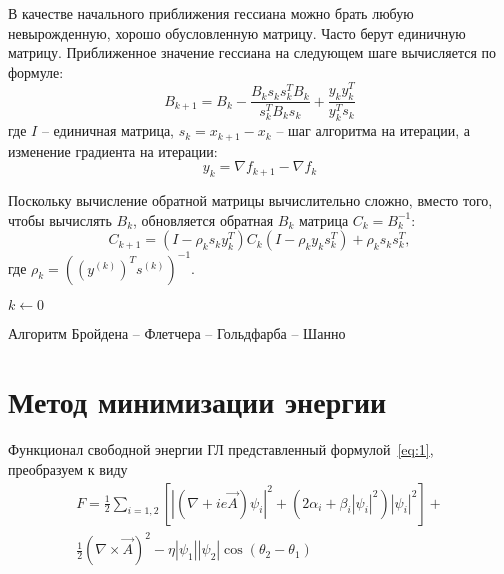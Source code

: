 В качестве начального приближения гессиана можно брать любую невырожденную, 
хорошо обусловленную матрицу. Часто берут единичную матрицу. Приближенное 
значение гессиана на следующем шаге вычисляется по формуле:
\[ 
    B_{k + 1} = B_k - \frac{B_k s_k s_k^T B_k}{s_k^T B_k s_k} + 
        \frac{y_k y_k^T}{y_k^T s_k} 
\]
где \( I \) -- единичная матрица, \( s_k = x_{k + 1} - x_k \) -- шаг алгоритма 
на итерации, а изменение градиента на итерации:
\begin{equation} 
    y_k = \nabla f_{k + 1} - \nabla f_{k} 
    \label{eq:y_k}
\end{equation}

Поскольку вычисление обратной матрицы вычислительно сложно, вместо того, 
чтобы вычислять \( B_k \), обновляется обратная \( B_k \) матрица 
\( C_k = B_k^{-1} \):
\begin{equation}
    C_{k + 1} = (I - \rho_k s_k y_k^T)C_k(I - \rho_k y_k s_k^T) + 
        \rho_k s_k s_k^T, 
    \label{eq:c_k}
\end{equation}
где \( \rho_k = ((y^{(k)})^T s^{(k)})^{-1} \).

\begin{algorithm}[H]
    \SetAlgoLined
    $k \gets 0$\;
    \caption{Алгоритм Бройдена -- Флетчера -- Гольдфарба -- Шанно 
        \cite{skajaa2010limited}}
\end{algorithm}

\section{Метод минимизации энергии}

Функционал свободной энергии ГЛ представленный формулой~\eqref{eq:1}, 
преобразуем к виду
\begin{gather}
    F = \frac{1}{2}\sum\limits_{i=1,2}\left[ 
        \left|\left( \nabla + ie\vec{A}\right)\psi_i\right|^2 + 
        \left( 2\alpha_i + \beta_i |\psi_i|^2 \right)|\psi_i|^2 \right] + 
        \nonumber \\
        \frac{1}{2}\left( \nabla\times\vec{A} \right)^2 - 
        \eta|\psi_1||\psi_2|\cos(\theta_2-\theta_1)
    \label{eqm:1}
\end{gather}

